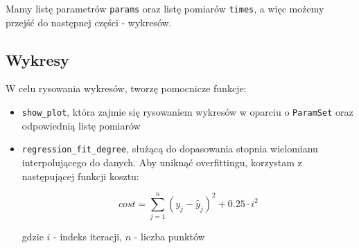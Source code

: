 \documentclass[11pt]{article}
\begin{document}
    Mamy listę parametrów \texttt{params} oraz listę pomiarów
\texttt{times}, a więc możemy przejść do następnej części - wykresów.

    \hypertarget{wykresy}{%
\subsection{Wykresy}\label{wykresy}}

W celu rysowania wykresów, tworzę pomocnicze funkcje:

\begin{itemize}
\item
  \texttt{show\_plot}, która zajmie się rysowaniem wykresów w oparciu o
  \texttt{ParamSet} oraz odpowiednią listę pomiarów
\item
  \texttt{regression\_fit\_degree}, służącą do dopasowania stopnia
  wielomianu interpolującego do danych. Aby uniknąć overfittingu,
  korzystam z następującej funkcji kosztu:

  \[ cost = \sum_{j=1}^{n} \left(y_j - \widehat{y}_j\right)^2 + 0.25 \cdot i^2 \]

  gdzie \(i\) - indeks iteracji, \(n\) - liczba punktów
\end{itemize}
\end{document}
